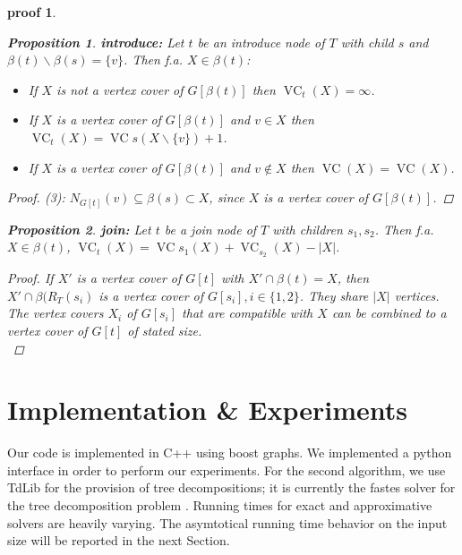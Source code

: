 \documentclass[11pt,a4paper]{article}
\newtheorem*{proposition}{Proposition}
\newtheorem*{proof_}{proof}
\DeclareMathOperator{\VC}{VC}
\begin{document}
\begin{proof_}
\begin{proposition}
\textbf{introduce:} Let $t$ be an introduce node of $T$ with child $s$ and $\beta(t) \backslash \beta(s) = \{v\}$. Then f.a. $X \in \beta(t)$:

\begin{itemize}
\item [(1)] If $X$ is not a vertex cover of $G[\beta(t)]$ then $\VC_{t}(X) = \infty$. 
\item [(2)] If $X$ is a vertex cover of $G[\beta(t)]$ and $v \in X$ then $\VC_{t}(X) = \VC{s}(X \backslash \{v\}) + 1$.
\item [(3)] If $X$ is a vertex cover of $G[\beta(t)]$ and $v \not \in X$ then $\VC(X) = \VC(X)$.
\end{itemize}
\end{proposition}

\begin{proof}
(3): $N_{G[t]}(v) \subseteq \beta(s) \subset X$, since $X$ is a vertex cover of $G[\beta(t)]$.
\end{proof}


\begin{proposition}
\textbf{join:} Let $t$ be a join node of $T$ with children $s_{1}, s_{2}$. Then f.a. $X \in \beta(t)$, $\VC_{t}(X) = \VC{s_{1}}(X) + \VC_{s_{2}}(X) - |X|$.
\end{proposition}

\begin{proof}
If $X'$ is a vertex cover of $G[t]$ with $X' \cap \beta(t) = X$, then $X' \cap \beta(R_{T}(s_{i})$ is a vertex cover of $G[s_{i}], i \in \{1,2\}$. They share $|X|$ vertices. The vertex covers $X_{i}$ of $G[s_{i}]$ that are compatible with $X$ can be combined to a vertex cover of $G[t]$ of stated size.  \\
\end{proof}
\end{proof_}

\section{Implementation \& Experiments}

Our code is implemented in C++ using boost graphs. We implemented a python interface in order to perform our experiments. For the second algorithm, we use TdLib for the provision of tree decompositions; it is currently the fastes solver for the tree decomposition problem \cite{TdLib} \cite{PACE_2017}. Running times for exact and approximative solvers are heavily varying. The asymtotical running time behavior on the input size will be reported in the next Section. \\
\end{document}
